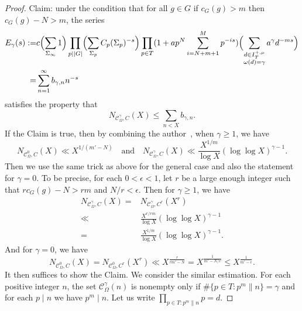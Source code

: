 \documentclass[12pt,a4paper]{amsart}
\numberwithin{equation}{section}%
\theoremstyle{plain}%
\theoremstyle{definition}%
\theoremstyle{remark}%
\begin{document}
\begin{proof}
    	Claim: under the condition that for all $g\in G$ if $c_{G}(g)>m$ then $c_{G}(g)-N>m$, the series
    	\begin{align*}
    		E_{\gamma}(s):=& c\Bigl(\sum_{\Sigma_{\infty}}1\Bigr)
    		\prod_{p\mid\lvert G\rvert}\Bigl(\sum_{\Sigma_{p}}C_{p}(\Sigma_{p})^{-s}\Bigr)
    		\prod_{p\in T}(1+ap^{N}\sum_{i=N+m+1}^{M}p^{-is})
    		\Bigl(\sum_{
    			\substack{
    				d\in I_{T}^{+,\mu} \\
    				\omega(d)=\gamma
    			}
    		}a^{\gamma}d^{-ms}\Bigr) \\
    		=& \sum_{n=1}^{\infty}b_{\gamma,n}n^{-s}
    	\end{align*}
    	satisfies the property that
    	\begin{equation*}
    		N_{\mathcal{C}_{\Omega}^{\gamma},C}(X)\leq\sum_{n<X}b_{\gamma,n}.
    	\end{equation*}
    	If the Claim is true, then by combining the author~\cite[5.1, 5.2, 5.4]{wang2026invariant}, when $\gamma\geq1$, we have
    	\begin{equation*}
    		N_{\mathcal{C}_{\Omega}^{0},C}(X)\ll X^{1/(m'-N)}\quad\text{and}\quad N_{\mathcal{C}_{\Omega}^{\gamma},C}(X)\ll\frac{X^{1/m}}{\log X}(\log\log X)^{\gamma-1}.
    	\end{equation*}
    	Then we use the same trick as above for the general case and also the statement for $\gamma=0$.
    	To be precise, for each $0<\epsilon<1$, let $r$ be a large enough integer such that $rc_{G}(g)-N>rm$ and $N/r<\epsilon$.
    	Then for $\gamma\geq1$, we have
    	\begin{align*}
    		N_{\mathcal{C}_{\Omega}^{\gamma},C}(X)=& N_{\mathcal{C}_{\Omega}^{\gamma},C^{r}}(X^{r}) \\
    		\ll & \frac{X^{r/rm}}{\log X}(\log\log X)^{\gamma-1} \\
    		=& \frac{X^{1/m}}{\log X}(\log\log X)^{\gamma-1}.
    	\end{align*}
    	And for $\gamma=0$, we have
    	\begin{equation*}
    		N_{\mathcal{C}_{\Omega}^{0},C}(X)=N_{\mathcal{C}_{\Omega}^{0},C^{r}}(X^{r})\ll X^{\frac{r}{rm'-N}}=X^{\frac{1}{m'-N/r}}\leq X^{\frac{1}{m'-\epsilon}}.
    	\end{equation*}
    	It then suffices to show the Claim.
    	We consider the similar estimation.
    	For each positive integer $n$, the set $\mathcal{C}_{\Omega}^{\gamma}(n)$ is nonempty only if $\#\{p\in T:p^{m}\| n\}=\gamma$ and for each $p\mid n$ we have $p^{m}\mid n$.
    	Let us write $\prod_{p\in T:p^{m}\| n}p=d$.

\end{proof}
\end{document}
